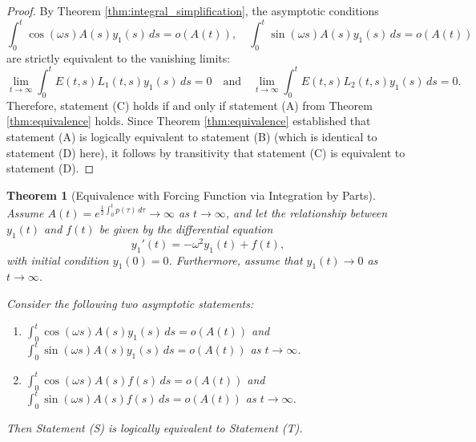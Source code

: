 \documentclass[10pt,reqno]{amsart}
\newtheorem{theorem}{Theorem}
\theoremstyle{definition}
\begin{document}
	\begin{proof}
		By Theorem \ref{thm:integral_simplification}, the asymptotic conditions $$\int_0^t \cos(\omega s) A(s) y_1(s) \, ds = o(A(t)), \quad  \int_0^t \sin(\omega s) A(s) y_1(s) \, ds = o(A(t))$$ are strictly equivalent to the vanishing limits:
		\[ \lim_{t \to \infty} \int_0^t E(t, s) L_1(t, s) y_1(s) \, ds = 0 \quad \text{and} \quad \lim_{t \to \infty} \int_0^t E(t, s) L_2(t, s) y_1(s) \, ds = 0. \]
		Therefore, statement (C) holds if and only if statement (A) from Theorem \ref{thm:equivalence} holds. Since Theorem \ref{thm:equivalence} established that statement (A) is logically equivalent to statement (B) (which is identical to statement (D) here), it follows by transitivity that statement (C) is equivalent to statement (D).
	\end{proof}
	
	\begin{theorem}[Equivalence with Forcing Function via Integration by Parts] \label{thm:forcing_ibp}
		Assume $A(t) = e^{\frac{1}{2} \int_0^t p(\tau) \, d\tau} \to \infty$ as $t \to \infty$, and let the relationship between $y_1(t)$ and $f(t)$ be given by the differential equation
		\[ y_1'(t) = -\omega^2 y_1(t) + f(t), \]
		with initial condition $y_1(0) = 0$. Furthermore, assume that $y_1(t) \to 0$ as $t \to \infty$. 
		
		Consider the following two asymptotic statements:
		\begin{enumerate}
			\item[(S)] $\int_0^t \cos(\omega s) A(s) y_1(s) \, ds = o(A(t))$ \quad and \quad $\int_0^t \sin(\omega s) A(s) y_1(s) \, ds = o(A(t))$ \quad as $t \to \infty$.
			\item[(T)] $\int_0^t \cos(\omega s) A(s) f(s) \, ds = o(A(t))$ \quad and \quad $\int_0^t \sin(\omega s) A(s) f(s) \, ds = o(A(t))$ \quad as $t \to \infty$.
		\end{enumerate}
		Then Statement (S) is logically equivalent to Statement (T).
	\end{theorem}
	
\end{document}
